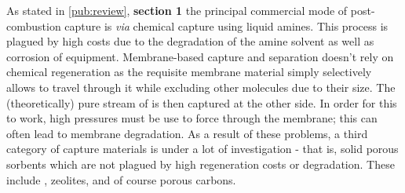 As stated in \ref{pub:review}, \textbf{section 1} the principal commercial mode of post-combustion  capture is \textit{via} chemical capture using liquid amines. This process is plagued by high costs due to the degradation of the amine solvent as well as corrosion of equipment.\citep{aronu2009solvent, dutcher2015amine, delgado2018degradation} Membrane-based  capture and separation doesn't rely on chemical regeneration as the requisite membrane material simply selectively allows  to travel through it while excluding other molecules due to their size.\citep{adewole2013current, ramasubramanian2011recent} The (theoretically) pure stream of  is then captured at the other side. In order for this to work, high pressures must be use to force  through the membrane; this can often lead to membrane degradation.\citep{powell2006polymeric} As a result of these problems, a third category of  capture materials is under a lot of investigation - that is, solid porous sorbents which are not plagued by high regeneration costs or degradation. These include ,\citep{Ding2019Carbon, qian2020mof} zeolites,\citep{Siriwardane2005Adsorption, Krishna2010silico} and of course porous carbons.\citep{Zhu2015Naturally, Chen2019Template, Xia2011Superior, Sevilla2016Highly} 

